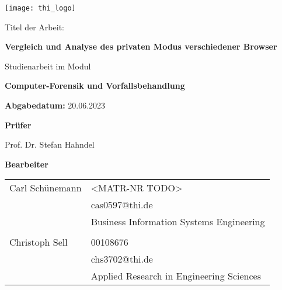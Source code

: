 


\thispagestyle{empty}

\begin{center}
	\texttt{[image: thi\_logo]}
\end{center}

\vspace{1.2cm}

\begin{center}{\large Titel der Arbeit:}\end{center}
\begin{center}
	{\huge \textbf{Vergleich und Analyse des privaten Modus verschiedener Browser}}
\end{center}

\vspace{1.2cm}

\begin{center}{\Large Studienarbeit im Modul}\end{center}
\begin{center}{\Large \textbf{Computer-Forensik und Vorfallsbehandlung}}\end{center}

\vspace{0.6cm}

\begin{center}{\large \textbf{Abgabedatum:} 20.06.2023}\end{center}

\vspace{0.6cm}

\begin{center}{\Large \textbf{Prüfer}}\end{center}
\begin{center}{\large Prof. Dr. Stefan Hahndel}\end{center}
	
\vspace{0.4cm}

\begin{center}{\Large \textbf{Bearbeiter}}\end{center}
\begin{center}
	\begin{Large}
		\begin{tabular}{ll}
			Carl Schünemann	& <MATR-NR TODO>  								\tabularnewline
							& cas0597@thi.de 							\tabularnewline
							& Business Information Systems Engineering 	\tabularnewline
							&											\tabularnewline
			Christoph Sell	& 00108676									\tabularnewline
							& chs3702@thi.de							\tabularnewline
							& Applied Research in Engineering Sciences 	\tabularnewline 
		\end{tabular}
	\end{Large}
\end{center}

